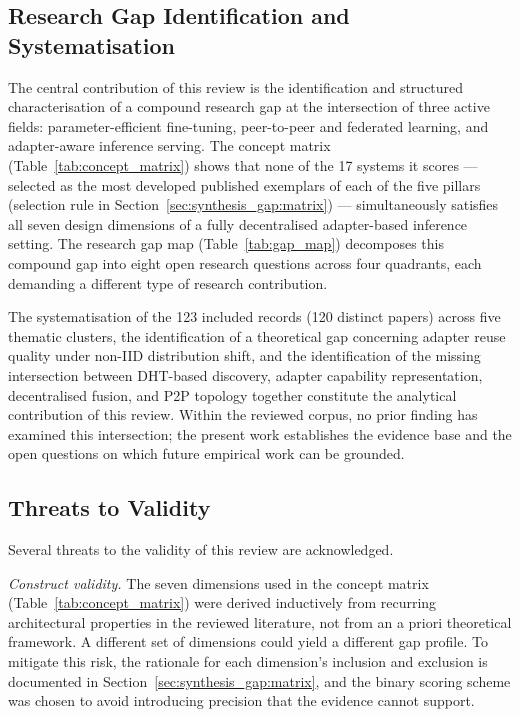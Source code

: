 \subsection{Research Gap Identification and Systematisation}
\label{sec:conclusion:contributions}

The central contribution of this review is the identification and structured
characterisation of a compound research gap at the intersection of three active
fields: parameter-efficient fine-tuning, peer-to-peer and federated learning,
and adapter-aware inference serving. The concept
matrix (Table~\ref{tab:concept_matrix}) shows that none of the 17 systems it
scores --- selected as the most developed published exemplars of each of the
five pillars (selection rule in
Section~\ref{sec:synthesis_gap:matrix}) --- simultaneously satisfies all seven
design dimensions of a fully decentralised adapter-based inference setting. The research gap map (Table~\ref{tab:gap_map})
decomposes this compound gap into eight open research questions across four
quadrants, each demanding a different type of research contribution.

The systematisation of the 123 included records (120 distinct papers) across five thematic clusters, the identification of a theoretical gap concerning adapter reuse quality under non-IID distribution shift, and the identification of the missing
intersection between DHT-based discovery, adapter capability representation,
decentralised fusion, and P2P topology together constitute the analytical
contribution of this review.
Within the reviewed corpus, no prior finding has examined this intersection; the present work establishes the evidence base and the open
questions on which future empirical work can be grounded.

\subsection{Threats to Validity}
\label{sec:conclusion:threats}

Several threats to the validity of this review are acknowledged.

\textit{Construct validity.}
The seven dimensions used in the concept matrix (Table~\ref{tab:concept_matrix}) were derived inductively from recurring architectural properties in the reviewed literature, not from an a priori theoretical framework. A different set of dimensions could yield a different gap profile. To mitigate this risk, the rationale for each dimension's inclusion and exclusion is documented in Section~\ref{sec:synthesis_gap:matrix}, and the binary scoring scheme was chosen to avoid introducing precision that the evidence cannot support.

